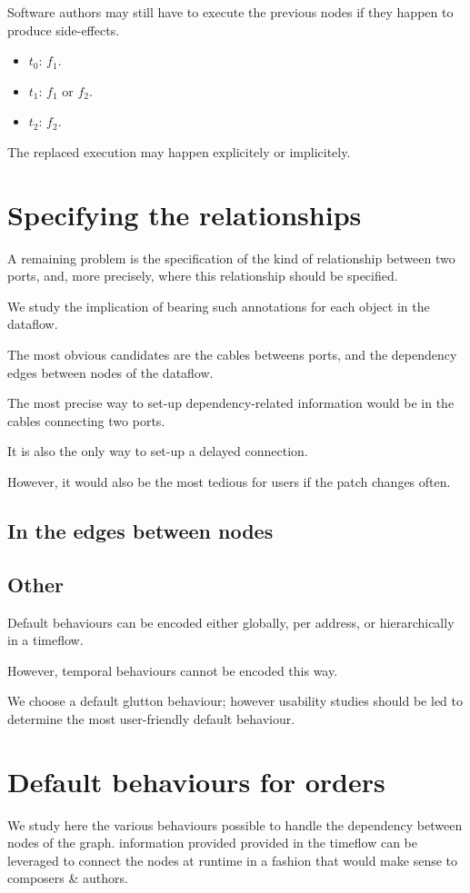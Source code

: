 \documentclass{article}
\begin{document}
Software authors may still have to execute the previous nodes if they happen to produce side-effects.
    
\begin{itemize}
  \item $t_0$: $f_1$.
  \item $t_1$: $f_1$ or $f_2$.
  \item $t_2$: $f_2$. 
\end{itemize}

The replaced execution may happen explicitely or implicitely.
    
\section{Specifying the relationships}
A remaining problem is the specification of the kind of relationship between two ports, and, more precisely, 
where this relationship should be specified.
    
We study the implication of bearing such annotations for each object in the dataflow.

The most obvious candidates are the cables betweens ports, and the dependency edges between nodes of the dataflow.

The most precise way to set-up dependency-related information would be in 
the cables connecting two ports. 
    
It is also the only way to set-up a delayed connection.
    
However, it would also be the most tedious for users if the patch changes often.

    
\subsection{In the edges between nodes}

\subsection{Other}
Default behaviours can be encoded either globally, per address, or hierarchically in a timeflow.

However, temporal behaviours cannot be encoded this way.

We choose a default glutton behaviour; however usability studies should be led to determine the most user-friendly default behaviour.

  
\section{Default behaviours for orders}
\label{sec.order}
We study here the various behaviours possible to handle the dependency between nodes of the graph.
information provided provided in the timeflow can be leveraged to connect the nodes at runtime in a fashion 
that would make sense to composers \& authors.
    
\end{document}
